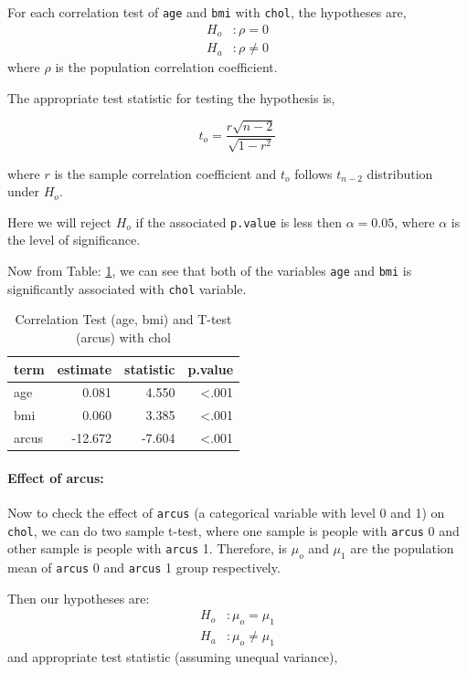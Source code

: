 \documentclass[
  12pt,
  oneside]{article}
\begin{document}
For each correlation test of \texttt{age} and \texttt{bmi} with \texttt{chol}, the hypotheses are,
\begin{align*}
H_o&: \rho = 0 \\
H_a&: \rho \neq 0
\end{align*}
where \(\rho\) is the population correlation coefficient.

The appropriate test statistic for testing the hypothesis is,

\[
t_o = \frac{r\sqrt{n-2}}{\sqrt{1-r^2}}
\]

where \(r\) is the sample correlation coefficient and \(t_o\) follows \(t_{n-2}\)
distribution under \(H_o\).

Here we will reject \(H_o\) if the associated \texttt{p.value} is less then \(\alpha = 0.05\), where \(\alpha\) is the level of significance.

Now from Table: \ref{tab:Table-02}, we can see that both of the variables \texttt{age} and \texttt{bmi} is significantly associated with \texttt{chol} variable.

\begin{table}[!h]

\caption{\label{tab:Table-02}Correlation Test (age, bmi) and T-test (arcus) with chol}
\centering
\begin{tabular}[t]{lrrr}
\toprule
term & estimate & statistic & p.value\\
\midrule
age & 0.081 & 4.550 & <.001\\
bmi & 0.060 & 3.385 & <.001\\
arcus & -12.672 & -7.604 & <.001\\
\bottomrule
\end{tabular}
\end{table}

\hypertarget{effect-of-arcus}{%
\paragraph{Effect of arcus:}\label{effect-of-arcus}}

Now to check the effect of \texttt{arcus} (a categorical variable with level 0 and 1) on \texttt{chol}, we can do two sample t-test, where one sample is people with \texttt{arcus} 0 and
other sample is people with \texttt{arcus} 1. Therefore, is \(\mu_o\) and \(\mu_1\) are the
population mean of \texttt{arcus} 0 and \texttt{arcus} 1 group respectively.

Then our hypotheses are:
\begin{align*}
H_o&: \mu_o = \mu_1 \\
H_a&: \mu_o \neq \mu_1
\end{align*}
and appropriate test statistic (assuming unequal variance),
\end{document}
